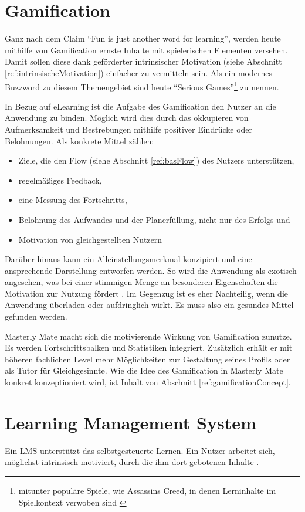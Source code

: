 \section{Gamification}\label{ref:gamification}
Ganz nach dem Claim "`Fun is just another word for learning"'\cite{koster:2005},
werden heute mithilfe von Gamification ernste Inhalte mit spielerischen
Elementen versehen. Damit sollen diese dank geförderter intrinsischer
Motivation (siehe Abschnitt \ref{ref:intrinsischeMotivation}) einfacher zu
vermitteln sein. Als ein modernes Buzzword zu diesem Themengebiet sind heute
"`Serious Games"'\footnote{mitunter populäre Spiele, wie Assassins Creed, in
denen Lerninhalte im Spielkontext verwoben sind \cite{breitlauch:2013}} zu
nennen.

In Bezug auf eLearning ist die Aufgabe des Gamification den Nutzer an die
Anwendung zu binden. Möglich wird dies durch das okkupieren von Aufmerksamkeit
und Bestrebungen mithilfe positiver Eindrücke oder Belohnungen. Als konkrete
Mittel zählen:
\begin{itemize}
  \item Ziele, die den Flow (siehe Abschnitt \ref{ref:basFlow}) des
Nutzers unterstützen,
	\item regelmäßiges Feedback,
	\item eine Messung des Fortschritts,
	\item Belohnung des Aufwandes und der Planerfüllung, nicht nur des Erfolgs und
	\item Motivation von gleichgestellten Nutzern
\end{itemize}
Darüber hinaus kann ein Alleinstellungsmerkmal konzipiert und eine ansprechende
Darstellung entworfen werden. So wird die Anwendung als exotisch angesehen, was
bei einer stimmigen Menge an besonderen Eigenschaften die Motivation zur Nutzung
fördert \cite{raymer:2011}. Im Gegenzug ist es eher Nachteilig, wenn die
Anwendung überladen oder aufdringlich wirkt. Es muss also ein gesundes Mittel
gefunden werden.

Masterly Mate macht sich die motivierende Wirkung von Gamification zunutze. Es
werden Fortschrittsbalken und Statistiken integriert. Zusätzlich erhält er mit
höheren fachlichen Level mehr Möglichkeiten zur Gestaltung seines Profils oder
als Tutor für Gleichgesinnte. Wie die Idee des Gamification in Masterly Mate
konkret konzeptioniert wird, ist Inhalt von Abschnitt
\ref{ref:gamificationConcept}.

\section{Learning Management System}
Ein LMS unterstützt das selbstgesteuerte Lernen. Ein Nutzer arbeitet sich,
möglichst intrinsisch motiviert, durch die ihm dort gebotenen Inhalte
\cite{wendt:2003}.

